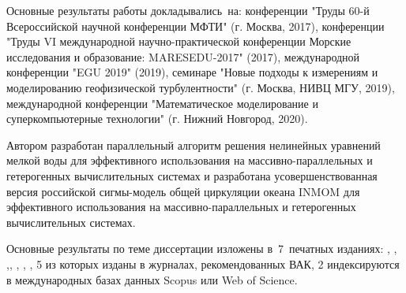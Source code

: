 {\probation}
Основные результаты работы докладывались~на:
конференции "Труды 60-й Всероссийской научной конференции МФТИ" (г. Москва, 2017), конференции "Труды VI международной научно-практической конференции Морские исследования и образование: MARESEDU-2017" (2017), международной конференции "EGU 2019" (2019), семинаре "Новые подходы к измерениям и моделированию геофизической турбулентности" (г. Москва, НИВЦ МГУ, 2019), международной конференции "Математическое моделирование и суперкомпьютерные технологии" (г. Нижний Новгород, 2020).


{\contribution} Автором разработан параллельный алгоритм решения нелинейных уравнений мелкой воды для эффективного использования на массивно-параллельных и гетерогенных вычислительных системах и разработана усовершенствованная версия российской сигмы-модель общей циркуляции океана INMOM для эффективного использования на массивно-параллельных и гетерогенных вычислительных системах.

{\publications}
Основные результаты по теме диссертации изложены
в~7~печатных изданиях: \cite{ChaplyginINMOM2017}, \cite{ChaplyginSW2017}, \cite{ChaplyginAzov2017},\cite{DianskyInertOsc2019}, \cite{ChaplyginLB2019}, \cite{ChaplyginSW2021}, \cite{Chaplygin_Gusev_Diansky_2022}, 
5 из которых изданы в журналах, рекомендованных ВАК, 2 индексируются в международных базах данных Scopus или Web of Science.
